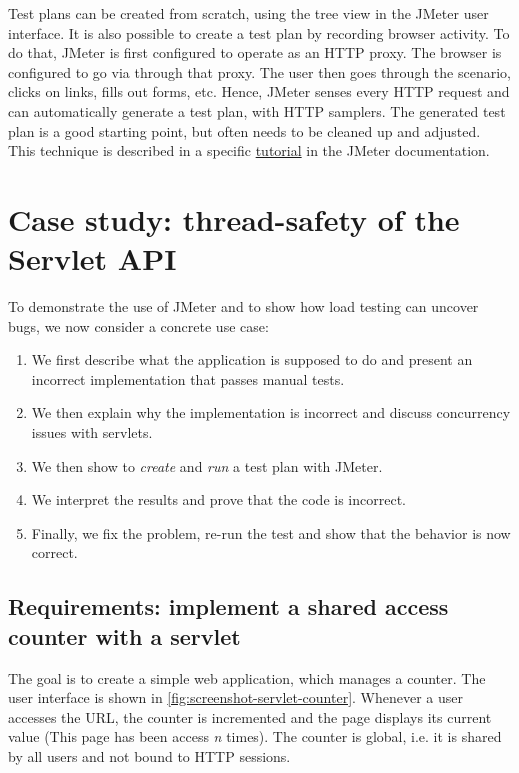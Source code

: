 Test plans can be created from scratch, using the tree view in the JMeter user interface. It is also possible to create a test plan by recording browser activity. To do that, JMeter is first configured to operate as an HTTP proxy. The browser is configured to go via through that proxy. The user then goes through the scenario, clicks on links, fills out forms, etc. Hence, JMeter senses every HTTP request and can automatically generate a test plan, with HTTP samplers. The generated test plan is a good starting point, but often needs to be cleaned up and adjusted. This technique is described in a specific \href{https://jmeter.apache.org/usermanual/jmeter_proxy_step_by_step.html}{tutorial} in the JMeter documentation.

\section{Case study: thread-safety of the Servlet API}

To demonstrate the use of JMeter and to show how load testing can uncover bugs, we now consider a concrete use case:

\begin{enumerate}
\item We first describe what the application is supposed to do and present an incorrect implementation that passes manual tests.
\item We then explain why the implementation is incorrect and discuss concurrency issues with servlets.
\item We then show to \emph{create} and \emph{run} a test plan with JMeter.
\item We interpret the results and prove that the code is incorrect.
\item Finally, we fix the problem, re-run the test and show that the behavior is now correct.
\end{enumerate}

\subsection{Requirements: implement a shared access counter with a servlet}

The goal is to create a simple web application, which manages a counter. The user interface is shown in \ref{fig:screenshot-servlet-counter}. Whenever a user accesses the URL, the counter is incremented and the page displays its current value (This page has been access \emph{n} times). The counter is global, i.e. it is shared by all users and not bound to HTTP sessions.

